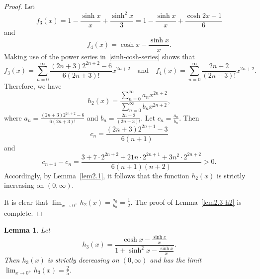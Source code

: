 \documentclass[reqno,a4paper]{amsart}
\numberwithin{equation}{section}
\theoremstyle{plain}
\newtheorem{lem}{Lemma}[section]
\theoremstyle{remark}
\begin{document}
\begin{proof}
Let
\begin{equation*}
f_3(x)=1-\frac{\sinh x}x+\frac{\sinh^2x}3=1-\frac{\sinh x}x+\frac{\cosh2x-1}6
\end{equation*}
and
\begin{equation*}
f_4(x)=\cosh x-\frac{\sinh x}x.
\end{equation*}
Making use of the power series in~\eqref{sinh-cosh-series} shows that
\begin{equation*}
f_3(x)=\sum_{n=0}^{\infty}\frac{(2n+3)2^{2n+2}-6}{6(2n+3)!}x^{2n+2}\quad
\text{and}\quad
f_4(x)=\sum_{n=0}^{\infty}\frac{2n+2}{(2n+3)!}x^{2n+2}.
\end{equation*}
Therefore, we have
\begin{equation}\label{lem2.3-h2-f3-f4-eq}
h_2(x)=\frac{\sum_{n=0}^{\infty}a_nx^{2n+2}}
{\sum_{n=0}^{\infty}b_nx^{2n+2}},
\end{equation}
where $a_n=\frac{(2n+3)2^{2n+2}-6}{6(2n+3)!}$ and $b_n=\frac{2n+2}{(2n+3)!}$.
Let $c_n=\frac{a_n}{b_n}$. Then
\begin{equation*}
c_n=\frac{(2n+3)2^{2n+1}-3}{6(n+1)}
\end{equation*}
and
\begin{equation*}
c_{n+1}-c_n=\frac{3+7\cdot2^{2n+2}+21n\cdot2^{2n+1}+3n^2\cdot2^{2n+2}}{6(n+1)(n+2)}>0.
\end{equation*}
Accordingly, by Lemma~\ref{lem2.1}, it follows that the function $h_2(x)$ is strictly increasing on $(0,\infty)$.
\par
It is clear that $\lim_{x\to0^+}h_2(x)=\frac{a_0}{b_0}=\frac12$.
The proof of Lemma~\ref{lem2.3-h2} is complete.
\end{proof}

\begin{lem}\label{lem2.4-h3}
Let
\begin{equation}
h_3(x)=\frac{\cosh x-\frac{\sinh x}x}{1+\sinh^2x-\frac{\sinh x}x}.
\end{equation}
Then $h_3(x)$ is strictly decreasing on $(0,\infty)$ and has the limit $\lim_{x\to0^+}h_3(x)=\frac25$.
\end{lem}
\end{document}
